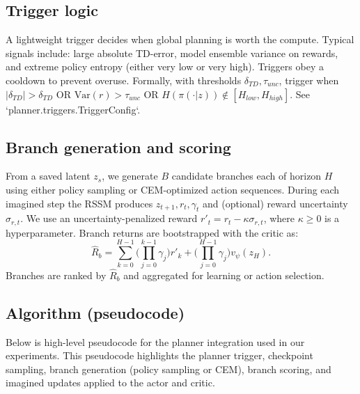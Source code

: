 \documentclass{article}
\begin{document}
\subsection{Trigger logic}
A lightweight trigger decides when global planning is worth the compute. Typical
signals include: large absolute TD-error, model ensemble variance on rewards,
and extreme policy entropy (either very low or very high). Triggers obey a
cooldown to prevent overuse. Formally, with thresholds \(\delta_{TD},\tau_{unc}\),
trigger when
\( |\delta_{TD}|>\delta_{TD} \) OR \( \mathrm{Var}(r)>\tau_{unc} \) OR
\( H(\pi(\cdot|z))\notin[H_{low},H_{high}]\). See `planner.triggers.TriggerConfig`.

\subsection{Branch generation and scoring}
From a saved latent \(z_s\), we generate \(B\) candidate branches each of
horizon \(H\) using either policy sampling or CEM-optimized action sequences.
During each imagined step the RSSM produces \(z_{t+1}, r_t, \gamma_t\) and
(optional) reward uncertainty \(\sigma_{r,t}\). We use an uncertainty-penalized
reward
\( r'_t = r_t - \kappa\sigma_{r,t} \), where \(\kappa\ge0\) is a hyperparameter.
Branch returns are bootstrapped with the critic as:
\begin{equation}
\hat R_b = \sum_{k=0}^{H-1}\Big(\prod_{j=0}^{k-1}\gamma_{j}\Big) r'_{k} + \Big(\prod_{j=0}^{H-1}\gamma_j\Big) v_\psi(z_{H}).
\end{equation}
Branches are ranked by \(\hat R_b\) and aggregated for learning or action
selection.

\subsection{Algorithm (pseudocode)}
Below is high-level pseudocode for the planner integration used in our
experiments. This pseudocode highlights the planner trigger, checkpoint sampling,
branch generation (policy sampling or CEM), branch scoring, and imagined
updates applied to the actor and critic.
\end{document}
